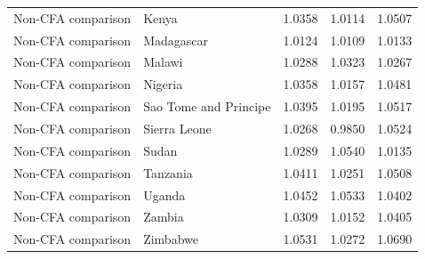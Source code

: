 \begin{table}
\begin{tabular}[t]{llrrr}
Non-CFA comparison & Kenya & 1.0358 & 1.0114 & 1.0507\\
\addlinespace
Non-CFA comparison & Madagascar & 1.0124 & 1.0109 & 1.0133\\
Non-CFA comparison & Malawi & 1.0288 & 1.0323 & 1.0267\\
Non-CFA comparison & Nigeria & 1.0358 & 1.0157 & 1.0481\\
Non-CFA comparison & Sao Tome and Principe & 1.0395 & 1.0195 & 1.0517\\
Non-CFA comparison & Sierra Leone & 1.0268 & 0.9850 & 1.0524\\
\addlinespace
Non-CFA comparison & Sudan & 1.0289 & 1.0540 & 1.0135\\
Non-CFA comparison & Tanzania & 1.0411 & 1.0251 & 1.0508\\
Non-CFA comparison & Uganda & 1.0452 & 1.0533 & 1.0402\\
Non-CFA comparison & Zambia & 1.0309 & 1.0152 & 1.0405\\
Non-CFA comparison & Zimbabwe & 1.0531 & 1.0272 & 1.0690\\
\bottomrule
\end{tabular}
\end{table}